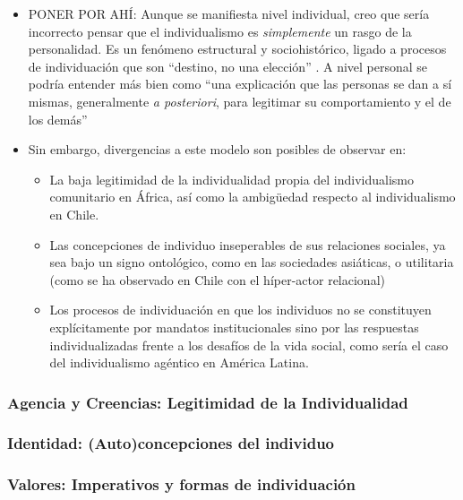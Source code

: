 \documentclass[12pt,twoside]{templates/facsothesis}
\providecommand{\tightlist}{%
  \setlength{\itemsep}{0pt}\setlength{\parskip}{0pt}}
\begin{document}
\begin{itemize}
\tightlist
\item
  PONER POR AHÍ: Aunque se manifiesta nivel individual, creo que sería incorrecto pensar que el individualismo es \emph{simplemente} un rasgo de la personalidad. Es un fenómeno estructural y sociohistórico, ligado a procesos de individuación que son ``destino, no una elección'' \citep[p.~23]{bauman2003}. A nivel personal se podría entender más bien como ``una explicación que las personas se dan a sí mismas, generalmente \emph{a posteriori}, para legitimar su comportamiento y el de los demás'' \citep[p.~12]{arribas1999}
\item
  Sin embargo, divergencias a este modelo son posibles de observar en:

  \begin{itemize}
  \tightlist
  \item
    La baja legitimidad de la individualidad propia del individualismo comunitario en África, así como la ambigüedad respecto al individualismo en Chile.
  \item
    Las concepciones de individuo inseperables de sus relaciones sociales, ya sea bajo un signo ontológico, como en las sociedades asiáticas, o utilitaria (como se ha observado en Chile con el híper-actor relacional)
  \item
    Los procesos de individuación en que los individuos no se constituyen explícitamente por mandatos institucionales sino por las respuestas individualizadas frente a los desafíos de la vida social, como sería el caso del individualismo agéntico en América Latina.
  \end{itemize}
\end{itemize}

\hypertarget{agencia-y-creencias-legitimidad-de-la-individualidad}{%
\subsubsection{Agencia y Creencias: Legitimidad de la Individualidad}\label{agencia-y-creencias-legitimidad-de-la-individualidad}}

\hypertarget{identidad-autoconcepciones-del-individuo}{%
\subsubsection{Identidad: (Auto)concepciones del individuo}\label{identidad-autoconcepciones-del-individuo}}

\hypertarget{valores-imperativos-y-formas-de-individuaciuxf3n}{%
\subsubsection{Valores: Imperativos y formas de individuación}\label{valores-imperativos-y-formas-de-individuaciuxf3n}}
\end{document}
